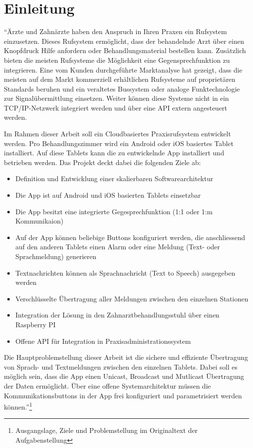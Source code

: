 \section{Einleitung}\label{sec:einleitung}

``Ärzte und Zahnärzte haben den Anspruch in Ihren Praxen ein Rufsystem einzusetzen.
Dieses Rufsystem ermöglicht, dass der behandelnde Arzt über einen Knopfdruck Hilfe anfordern oder Behandlungsmaterial bestellen kann.
Zusätzlich bieten die meisten Rufsysteme die Möglichkeit eine Gegensprechfunktion zu integrieren.
Eine vom Kunden durchgeführte Marktanalyse hat gezeigt, dass die meisten auf dem Markt kommerziell erhältlichen Rufsysteme auf proprietären Standards beruhen und ein veraltetes Bussystem oder analoge Funktechnologie zur Signalübermittlung einsetzen.
Weiter können diese Systeme nicht in ein TCP/IP-Netzwerk integriert werden und über eine API extern angesteuert werden.

Im Rahmen dieser Arbeit soll ein Cloudbasiertes Praxisrufsystem entwickelt werden.
Pro Behandlungszimmer wird ein Android oder iOS basiertes Tablet installiert.
Auf diese Tablets kann die zu entwickelnde App installiert und betrieben werden.
Das Projekt deckt dabei die folgenden Ziele ab:

\begin{itemize}
    \item Definition und Entwicklung einer skalierbaren Softwarearchitektur
    \item Die App ist auf Android und iOS basierten Tablets einsetzbar
    \item Die App besitzt eine integrierte Gegesprechfunktion (1:1 oder 1:m Kommunikaion)
    \item Auf der App können beliebige Buttons konfiguriert werden, die anschliessend auf den anderen Tablets einen Alarm oder eine Meldung (Text- oder Sprachmeldung) generieren
    \item Textnachrichten können als Sprachnachricht (Text to Speech) ausgegeben werden
    \item Verschlüsselte Übertragung aller Meldungen zwischen den einzelnen Stationen
    \item Integration der Lösung in den Zahnarztbehandlungsstuhl über einen Raspberry PI
    \item Offene API für Integration in Praxisadministrationssystem
\end{itemize}

Die Hauptproblemstellung dieser Arbeit ist die sichere und effiziente Übertragung von Sprach- und Textmeldungen zwischen den einzelnen Tablets.
Dabei soll es möglich sein, dass die App einen Unicast, Broadcast und Mutlicast Übertragung der Daten ermöglicht.
Über eine offene Systemarchitektur müssen die Kommunikationsbuttons in der App frei konfiguriert und parametrisiert werden können.''\footnote{Ausgangslage, Ziele und Problemstellung im Originaltext der Aufgabenstellung}\cite{aufgabenstellung}

